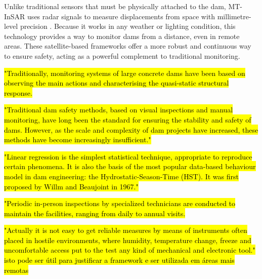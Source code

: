 \documentclass[11pt,a4paper]{article}
\begin{document}
Unlike traditional sensors that must be physically attached to the dam, MT-InSAR uses radar signals to measure displacements from space with millimetre-level precision \parencite{xie2022, cernuto2026}. Because it works in any weather or lighting condition, this technology provides a way to monitor dams from a distance, even in remote areas. These satellite-based frameworks offer a more robust and continuous way to ensure safety, acting as a powerful complement to traditional monitoring.

\hl{\mbox{\parencite{mataAnalysisInterpretationObserved2023}} "Traditionally, monitoring systems of large concrete dams have been based on observing the main actions and characterising the quasi-static structural response.}

\hl{\mbox{\parencite{hariri-ardebili2023}} "Traditional dam safety methods, based on visual inspections and manual monitoring, have long been the standard for ensuring the stability and safety of dams. However, as the scale and complexity of dam projects have increased, these methods have become increasingly insufficient."}

\hl{\mbox{\parencite{salazargonzalez2017}} "Linear regression is the simplest statistical technique, appropriate to reproduce certain phenomena. It is also the basis of the most popular data-based behaviour model in dam engineering: the Hydrostatic-Season-Time (HST). It was first proposed by Willm and Beaujoint  in 1967."}

\hl{\mbox{\parencite{ruiz-armenteros2023}} "Periodic in-person inspections by specialized technicians are conducted to maintain the facilities, ranging from daily to annual visits.}

\hl{\mbox{\parencite{desortis2007}} "Actually it is not easy to get reliable measures by means of instruments often placed in hostile environments, where humidity, temperature change, freeze and uncomfortable access put to the test any kind of mechanical and electronic tool." isto pode ser útil para justificar a framework e ser utilizada em áreas mais remotas}
\end{document}
